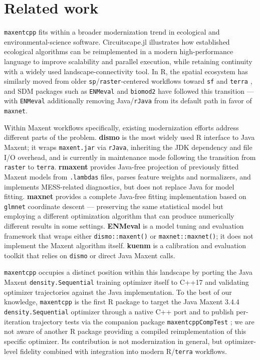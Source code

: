 \documentclass[10pt,letterpaper]{article}
\begin{document}
\section*{Related work}

\texttt{maxentcpp} fits within a broader modernization trend in
ecological and environmental-science software. Circuitscape.jl
\cite{Hall2021} illustrates how established ecological algorithms can
be reimplemented in a modern high-performance language to improve
scalability and parallel execution, while retaining continuity with a
widely used landscape-connectivity tool. In R, the spatial ecosystem has
similarly moved from older \texttt{sp}/\texttt{raster}-centered
workflows toward \texttt{sf} \cite{Pebesma2018} and \texttt{terra}
\cite{Hijmans2024}, and SDM packages such as \texttt{ENMeval}
\cite{Kass2021} and \texttt{biomod2} \cite{Thuiller2009} have followed
this transition --- with \texttt{ENMeval} additionally removing
Java/\texttt{rJava} from its default path in favor of \texttt{maxnet}.

Within Maxent workflows specifically, existing modernization efforts
address different parts of the problem. \textbf{dismo}
\cite{Hijmans2023} is the most widely used R interface to Java Maxent;
it wraps \texttt{maxent.jar} via \texttt{rJava}, inheriting the JDK
dependency and file I/O overhead, and is currently in maintenance mode
following the transition from \texttt{raster} to \texttt{terra}.
\textbf{rmaxent} \cite{Baumgartner2017} provides Java-free projection
of previously fitted Maxent models from \texttt{.lambdas} files, parses
feature weights and normalizers, and implements MESS-related
diagnostics, but does not replace Java for model fitting.
\textbf{maxnet} \cite{Phillips2024maxnet,Friedman2010} provides a
complete Java-free fitting implementation based on \texttt{glmnet}
coordinate descent --- preserving the same statistical model but
employing a different optimization algorithm that can produce
numerically different results in some settings. \textbf{ENMeval}
\cite{Kass2021} is a model tuning and evaluation framework that wraps
either \texttt{dismo::maxent()} or \texttt{maxnet::maxnet()}; it does
not implement the Maxent algorithm itself. \textbf{kuenm}
\cite{Cobos2019} is a calibration and evaluation toolkit that relies on
\texttt{dismo} or direct Java Maxent calls.

\texttt{maxentcpp} occupies a distinct position within this landscape by
porting the Java Maxent \texttt{density.Sequential} training optimizer
itself to C++17 and validating optimizer trajectories against the Java
implementation. To the best of our knowledge, \texttt{maxentcpp} is the
first R package to target the Java Maxent 3.4.4
\texttt{density.Sequential} optimizer through a native C++ port and to
publish per-iteration trajectory tests via the companion package
\texttt{maxentcppCompTest} \cite{maxentcppCompTest2025}; we are not
aware of another R package providing a compiled reimplementation of this
specific optimizer. Its contribution is not modernization in general,
but optimizer-level fidelity combined with integration into modern
R/\texttt{terra} workflows.
\end{document}
